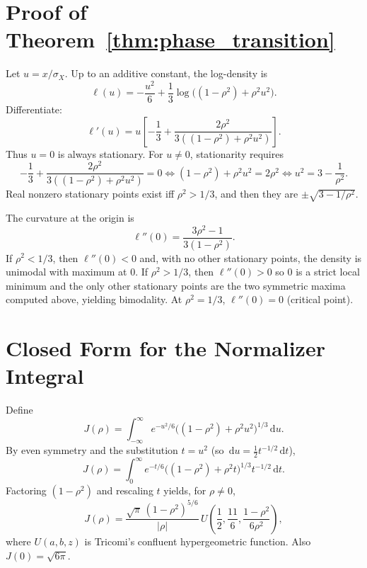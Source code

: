 \documentclass{article}
\newcommand{\abs}[1]{\left\lvert #1 \right\rvert}
\newcommand{\dd}{\,\mathrm{d}}
\begin{document}
\section{Proof of Theorem~\ref{thm:phase_transition}}\label{app:proof_phase_transition}
Let $u=x/\sigma_X$. Up to an additive constant, the log-density is
\[
\ell(u)= -\frac{u^2}{6}+\frac{1}{3}\log\big((1-\rho^2)+\rho^2u^2\big).
\]
Differentiate:
\[
\ell'(u)
= u\left[-\frac{1}{3}+\frac{2\rho^2}{3((1-\rho^2)+\rho^2u^2)}\right].
\]
Thus $u=0$ is always stationary. For $u\neq 0$, stationarity requires
\[
-\frac{1}{3}+\frac{2\rho^2}{3((1-\rho^2)+\rho^2u^2)}=0
\iff (1-\rho^2)+\rho^2u^2=2\rho^2
\iff u^2=3-\frac{1}{\rho^2}.
\]
Real nonzero stationary points exist iff $\rho^2>1/3$, and then they are $\pm\sqrt{3-1/\rho^2}$.

The curvature at the origin is
\[
\ell''(0)=\frac{3\rho^2-1}{3(1-\rho^2)}.
\]
If $\rho^2<1/3$, then $\ell''(0)<0$ and, with no other stationary points, the density is unimodal with maximum at $0$.
If $\rho^2>1/3$, then $\ell''(0)>0$ so $0$ is a strict local minimum and the only other stationary points are the two symmetric maxima computed above, yielding bimodality.
At $\rho^2=1/3$, $\ell''(0)=0$ (critical point). \qedhere

\section{Closed Form for the Normalizer Integral}\label{app:normalizer}
Define
\[
J(\rho)=\int_{-\infty}^{\infty} e^{-u^2/6}\big((1-\rho^2)+\rho^2u^2\big)^{1/3}\dd u.
\]
By even symmetry and the substitution $t=u^2$ (so $\dd u=\tfrac{1}{2}t^{-1/2}\dd t$),
\begin{equation}\label{eq:J_t}
J(\rho)=\int_0^\infty e^{-t/6}\big((1-\rho^2)+\rho^2 t\big)^{1/3} t^{-1/2}\dd t.
\end{equation}
Factoring $(1-\rho^2)$ and rescaling $t$ yields, for $\rho\neq 0$,
\begin{equation}\label{eq:J_U_app}
J(\rho)=
\frac{\sqrt{\pi}\,(1-\rho^2)^{5/6}}{\abs{\rho}}\, U\!\left(\frac12,\frac{11}{6},\frac{1-\rho^2}{6\rho^2}\right),
\end{equation}
where $U(a,b,z)$ is Tricomi's confluent hypergeometric function. Also $J(0)=\sqrt{6\pi}$.
\end{document}
